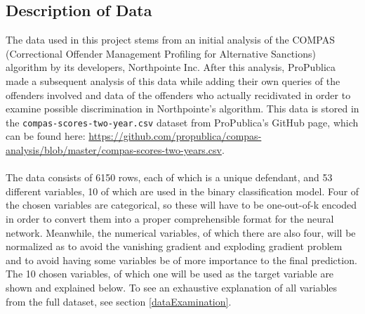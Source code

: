 \documentclass[11pt, fleqn, titlepage]{article}
\begin{document}
	\subsection{Description of Data} \label{dataDescription}
	The data used in this project stems from an initial analysis of the COMPAS (Correctional Offender Management Profiling for Alternative Sanctions) algorithm by its developers, Northpointe Inc. After this analysis, ProPublica made a subsequent analysis of this data while adding their own queries of the offenders involved and data of the offenders who actually recidivated in order to examine possible discrimination in Northpointe's algorithm. This data is stored in the \texttt{compas-scores-two-year.csv} dataset from ProPublica's GitHub page, which can be found here: \url{https://github.com/propublica/compas-analysis/blob/master/compas-scores-two-years.csv}. \\\\
	\noindent The data consists of 6150 rows, each of which is a unique defendant, and 53 different variables, 10 of which are used in the binary classification model. Four of the chosen variables are categorical, so these will have to be one-out-of-k encoded in order to convert them into a proper comprehensible format for the neural network. Meanwhile, the numerical variables, of which there are also four, will be normalized as to avoid the vanishing gradient and exploding gradient problem and to avoid having some variables be of more importance to the final prediction.
	The 10 chosen variables, of which one will be used as the target variable are shown and explained below. To see an exhaustive explanation of all variables from the full dataset, see section \ref{dataExamination}.
	
\end{document}
